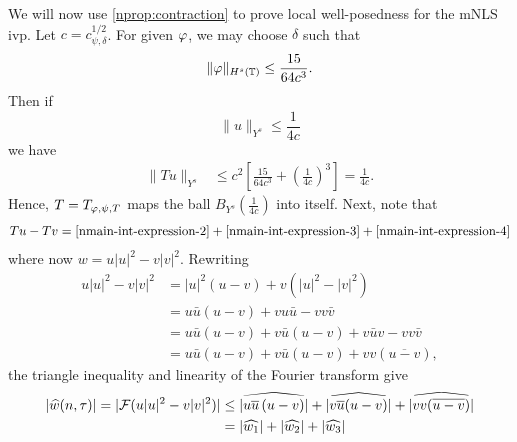 We will now use \cref{nprop:contraction} to prove local well-posedness for the 
mNLS ivp. Let $c = c_{\psi, \delta}^{1/2}$. For given $\varphi$, we may choose $\delta$ such
that 
%
\begin{equation*}
	\begin{split}
		\|\varphi\|_{H^s(\mathbb{T})} \le \frac{15}{64c^3}.
	\end{split}
\end{equation*}
%
Then if $$\|u\|_{Y^s} \le \frac{1}{4c}$$ we have
%
\begin{equation*}
	\begin{split}
		\|T u \|_{Y^s} 
		& \le c^2 \left[ \frac{15}{64c^3} + \left( 
		\frac{1}{4c} \right)^3 \right]
		=  \frac{1}{4c}.
	\end{split}
\end{equation*}
%
Hence, $T=T_{\varphi, \psi, T}$ maps the ball $B_{Y^{s}}\left( \frac{1}{4c} \right)$ into 
itself. Next, note that
%
\begin{equation*}
	\begin{split}
		Tu - Tv = \eqref{nmain-int-expression-2} + \eqref{nmain-int-expression-3} 
		+ \eqref{nmain-int-expression-4}
	\end{split}
\end{equation*}
%
where now $w = u | u |^2 - v | v |^{2}$. Rewriting
%
\begin{equation*}
	\begin{split}
		u | u |^{2} - v | v |^{2}
		& = | u |^2 \left( u -v \right) + v\left( | u 
		|^2 - | v |^2
		\right)
		\\
		& = u \bar u \left( u -v \right) + v u \bar u - v v \bar v
		\\
		& = u \bar u \left( u - v \right) + v \bar u\left( u - v \right) + v 
		\bar u v - v v \bar v
		\\
		& = u \bar u \left( u -v \right) + v \bar u\left( u - v \right) + v v 
		\left( \overline{u -v} \right),
	\end{split}
\end{equation*}
%
the triangle inequality and linearity of the Fourier transform give
%
\begin{equation*}
	\begin{split}
		| \widehat{w}(n, \tau) | = | \mathcal{F}(u | u |^2 - v| v |^2) |
		& \le | \widehat{u \overline{u} \left (u -v \right )} | +
		| \widehat{v \overline{u} (u -v)} | + |\widehat{v v 
		(\overline{u-v})}|
		\\
		& = | \widehat{w_1} | + | \widehat{w_2} | + | \widehat{w_3} |
	\end{split}
\end{equation*}
